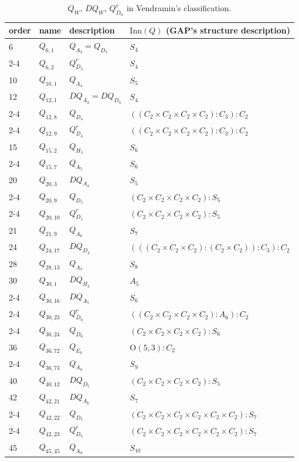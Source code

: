 \documentclass{amsart}
\theoremstyle{definition}
\theoremstyle{remark}
\numberwithin{equation}{section}
\begin{document}
\begin{table}
\caption{$Q_W$, $DQ_W$, $Q^r_{D_n}$ in Vendramin's classification.}
\begin{tabular}{l|l|l|l}
order & name & description & $\mathrm{Inn}(Q)$ (GAP's structure description)\\
\hline
6 & $Q_{6,1}$ &  $Q_{A_3} = Q_{D_3}$ & $S_4$ \\ \cline{2-4}
  & $Q_{6,2}$ &  $Q^r_{D_3}$ & $S_4$ \\ \hline
10 & $Q_{10,1}$ & $Q_{A_4}$ & $S_5$ \\ \hline 
12 & $Q_{12,1}$ & $DQ_{A_3} = DQ_{D_3}$ & $S_4$ \\ \cline{2-4}
 & $Q_{12,8}$ & $Q_{D_4}$ & $((C_2 \times C_2 \times C_2 \times C_2) : C_3) : C_2$ \\ \cline{2-4}
 & $Q_{12,9}$ & $Q^r_{D_4}$ & $((C_2 \times C_2 \times C_2 \times C_2) : C_3) : C_2$ \\ \hline
15  & $Q_{15,2}$ & $Q_{H_3}$ & $S_6$ \\ \cline{2-4}
  & $Q_{15,7}$ & $Q_{A_5}$ & $S_6$ \\ \hline
20 & $Q_{20,3}$ & $DQ_{A_4}$ & $S_5$ \\ \cline{2-4}
  & $Q_{20,9}$ & $Q_{D_5}$  & $(C_2 \times C_2 \times C_2 \times C_2) : S_5$ \\ \cline{2-4}
  & $Q_{20,10}$ & $Q^r_{D_5}$ & $(C_2 \times C_2 \times C_2 \times C_2) : S_5$ \\ \hline
21 & $Q_{21,9}$ & $Q_{A_6}$ & $S_7$ \\ \hline
24 & $Q_{24,17}$ & $DQ_{D_4}$ & $(((C_2 \times C_2 \times C_2) : (C_2 \times C_2)) : C_3) : C_2$ \\ \hline
28 & $Q_{28,13}$ & $Q_{A_7}$ & $S_8$ \\ \hline
30 & $Q_{30,1}$ & $DQ_{H_3}$ & $A_5$ \\ \cline{2-4}
  & $Q_{30,16}$ & $DQ_{A_5}$ & $S_6$\\ \cline{2-4}
  & $Q_{30,23}$ & $Q^r_{D_6}$ & $((C_2 \times C_2 \times C_2 \times C_2) : A_6) : C_2$ \\ \cline{2-4}
  & $Q_{30,24}$ & $Q_{D_6}$ & $(C_2 \times C_2 \times C_2 \times C_2) : S_6$\\ \hline
36 & $Q_{36,72}$ & $Q_{E_6}$ & $\mathrm{O}(5,3) : C_2$\\ \cline{2-4}
 & $Q_{36,73}$ & $Q_{A_8}$ & $S_9$ \\ \hline
40 & $Q_{40,12}$ & $DQ_{D_5}$ & $(C_2 \times C_2 \times C_2 \times C_2) : S_5$ \\ \hline
42 & $Q_{42,21}$ & $DQ_{A_6}$ & $S_7$ \\ \cline{2-4}
 & $Q_{42,22}$ & $Q_{D_7}$ & $(C_2 \times C_2 \times C_2 \times C_2 \times C_2 \times C_2) : S_7$ \\ \cline{2-4}
 & $Q_{42,23}$ & $Q^r_{D_7}$ & $(C_2 \times C_2 \times C_2 \times C_2 \times C_2 \times C_2) : S_7$ \\ \hline
45 & $Q_{45,45}$ & $Q_{A_9}$ & $S_{10}$ \\
\end{tabular}
\label{table:small_quandles}
\end{table}
\end{document}
